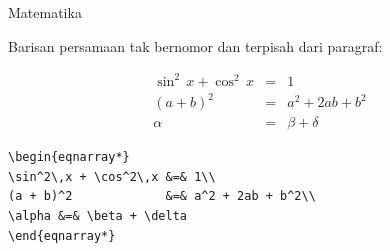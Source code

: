 \documentclass[11pt,            %
               aspectratio=169, %
               xcolor=svgnames,
               t                %
               ]{beamer}
\begin{document}
\begin{frame}{Matematika}
\newpage

Barisan persamaan tak bernomor dan terpisah dari paragraf:

\begin{eqnarray*}
\sin^2\,x + \cos^2\,x &=& 1\\
(a + b)^2             &=& a^2 + 2ab + b^2\\
\alpha &=& \beta + \delta
\end{eqnarray*}

\begin{block}{}
\begin{verbatim}
\begin{eqnarray*}
\sin^2\,x + \cos^2\,x &=& 1\\
(a + b)^2             &=& a^2 + 2ab + b^2\\
\alpha &=& \beta + \delta
\end{eqnarray*}
\end{verbatim}
\end{block}

\end{frame}

\end{document}
